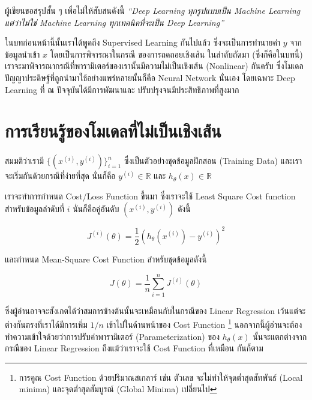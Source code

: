 ผู้เขียนขอสรุปสั้น ๆ เพื่อไม่ให้สับสนดังนี้ \textit{\enquote{Deep Learning ทุกรูปแบบเป็น Machine Learning แต่ว่าไม่ใช่ Machine 
Learning ทุกเทคนิคที่จะเป็น Deep Learning}}

ในบทก่อนหน้านี้นั้นเราได้พูดถึง Supervised Learning กันไปแล้ว ซึ่งจะเป็นการทำนายค่า $y$ จากข้อมูลนำเข้า $x$ โดยเป็นการพิจารณาในกรณี%
ของการถดถอยเชิงเส้น ในลำดับถัดมา (ซึ่งก็คือในบทนี้) เราจะมาพิจารณากรณีที่พารามิเตอร์ของเรานั้นมีความไม่เป็นเชิงเส้น (Nonlinear) กันครับ
ซึ่งโมเดลปัญญาประดิษฐ์ที่ถูกนำมาใช้อย่างแพร่หลายนั้นก็คือ Neural Network นั่นเอง โดยเฉพาะ Deep Learning ที่ ณ ปัจจุบันได้มีการพัฒนาและ%
ปรับปรุงจนมีประสิทธิภาพที่สูงมาก

\section{การเรียนรู้ของโมเดลที่ไม่เป็นเชิงเส้น}
\label{sec:nonlinear_ml}

สมมติว่าเรามี $\{(x^{(i)}, y^{(i)})\}^n_{i=1}$ ซึ่งเป็นตัวอย่างชุดข้อมูลฝึกสอน (Training Data) และเราจะเริ่มกันด้วยกรณีที่ง่ายที่สุด%
นั่นก็คือ $y^{(i)} \in \mathbb{R}$ และ $h_\theta(x) \in \mathbb{R}$ 

เราจะทำการกำหนด Cost/Loss Function ขึ้นมา ซึ่งเราจะใช้ Least Square Cost function สำหรับข้อมูลลำดับที่ $i$ นั่นก็คือคู่อันดับ 
$(x^{(i)} ,y^{(i)} )$ ดังนี้ 

\begin{equation}\label{eq:loss}
    J^{(i)} (\theta) = \frac{1}{2} \left(h_\theta (x^{(i)}) - y^{(i)}\right)^2
\end{equation}

\noindent และกำหนด Mean-Square Cost Function สำหรับชุดข้อมูลดังนี้

\begin{equation}\label{eq:mse_loss}
    J(\theta) = \frac 1 n \sum_{i=1}^n J^{(i)}(\theta)
\end{equation}

\noindent ซึ่งผู้อ่านอาจจะสังเกตได้ว่าสมการข้างต้นนั้นจะเหมือนกับในกรณีของ Linear Regression เว้นแต่จะต่างกันตรงที่เราได้มีการเพิ่ม $1/n$
เข้าไปในด้านหน้าของ Cost Function \footnote{การคูณ Cost Function ด้วยปริมาณสเกลาร์ เช่น ตัวเลข จะไม่ทำให้จุดต่ำสุดสัทพันธ์ 
(Local minima) และจุดต่ำสุดสัมบูรณ์ (Global Minima) เปลี่ยนไป} นอกจากนี้ผู้อ่านจะต้องทำความเข้าใจด้วยว่าการปรับค่าพารามิเตอร์ 
(Parameterization) ของ $h_\theta(x)$ นั้นจะแตกต่างจากกรณีของ Linear Regression ถึงแม้ว่าเราจะใช้ Cost Function ที่เหมือน%
กันก็ตาม 

